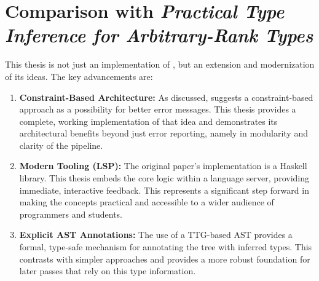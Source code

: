 \section{Comparison with \textit{Practical Type Inference for Arbitrary-Rank Types}}
\label{sec:Discussion:Comparison}
This thesis is not just an implementation of \cite{jones-practical-2007}, but an extension and modernization of its ideas. The key advancements are:
\begin{enumerate}
    \item \textbf{Constraint-Based Architecture:} As discussed, \cite{jones-practical-2007} suggests a constraint-based approach as a possibility for better error messages. This thesis provides a complete, working implementation of that idea and demonstrates its architectural benefits beyond just error reporting, namely in modularity and clarity of the pipeline.

    \item \textbf{Modern Tooling (LSP):} The original paper's implementation is a Haskell library. This thesis embeds the core logic within a language server, providing immediate, interactive feedback. This represents a significant step forward in making the concepts practical and accessible to a wider audience of programmers and students.

    \item \textbf{Explicit AST Annotations:} The use of a TTG-based AST provides a formal, type-safe mechanism for annotating the tree with inferred types. This contrasts with simpler approaches and provides a more robust foundation for later passes that rely on this type information.
\end{enumerate}
